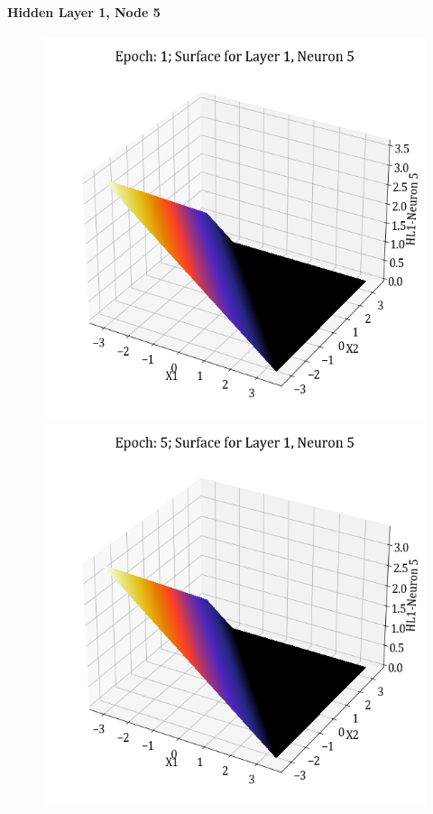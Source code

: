 \documentclass[11pt,a4paper]{article}
\begin{document}
\paragraph{Hidden Layer 1, Node 5}
\begin{figure}[H]
    \centering
    \includegraphics[scale=0.4]{images/1B_MLFFNN_E1_HL1_N5.png}
    \includegraphics[scale=0.4]{images/1B_MLFFNN_E5_HL1_N5.png}

\end{figure}
\end{document}
